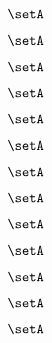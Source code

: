 \begin{forslides}
    \begin{equation}
        \label{eq:slides-processes-90}
        \setA
    \end{equation}

    \begin{equation}
        \label{eq:slides-processes-91}
        \setA
    \end{equation}

    \begin{equation}
        \label{eq:slides-processes-92}
        \setA
    \end{equation}

    \begin{equation}
        \label{eq:slides-processes-93}
        \setA
    \end{equation}

    \begin{equation}
        \label{eq:slides-processes-94}
        \setA
    \end{equation}

    \begin{equation}
        \label{eq:slides-processes-95}
        \setA
    \end{equation}

    \begin{equation}
        \label{eq:slides-processes-96}
        \setA
    \end{equation}

    \begin{equation}
        \label{eq:slides-processes-97}
        \setA
    \end{equation}

    \begin{equation}
        \label{eq:slides-processes-98}
        \setA
    \end{equation}

    \begin{equation}
        \label{eq:slides-processes-99}
        \setA
    \end{equation}

    \begin{equation}
        \label{eq:slides-processes-100}
        \setA
    \end{equation}

    \begin{equation}
        \label{eq:slides-processes-111}
        \setA
    \end{equation}

    \begin{equation}
        \label{eq:slides-processes-112}
        \setA
    \end{equation}


\end{forslides}
